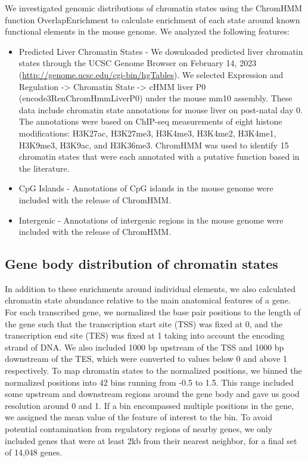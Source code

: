 \documentclass[
  11pt,
]{article}
\begin{document}
We investigated genomic distributions of chromatin states using the
ChromHMM function OverlapEnrichment to calculate enrichment of each
state around known functional elements in the mouse genome. We analyzed
the following features:

\begin{itemize}
\item
  Predicted Liver Chromatin States - We downloaded predicted liver
  chromatin states through the UCSC Genome Browser on February 14, 2023
  (\url{http://genome.ucsc.edu/cgi-bin/hgTables}). We selected
  Expression and Regulation -\textgreater{} Chromatin State
  -\textgreater{} cHMM liver P0 (encode3RenChromHmmLiverP0) under the
  mouse mm10 assembly. These data include chromatin state annotations
  for mouse liver on post-natal day 0. The annotations were based on
  ChIP-seq measurements of eight histone modifications: H3K27ac,
  H3K27me3, H3K4me3, H3K4me2, H3K4me1, H3K9me3, H3K9ac, and H3K36me3.
  ChromHMM was used to identify 15 chromatin states that were each
  annotated with a putative function based in the literature.
\item
  CpG Islands - Annotations of CpG islands in the mouse genome were
  included with the release of ChromHMM.
\item
  Intergenic - Annotations of intergenic regions in the mouse genome
  were included with the release of ChromHMM.
\end{itemize}

\hypertarget{gene-body-distribution-of-chromatin-states}{%
\subsection{Gene body distribution of chromatin
states}\label{gene-body-distribution-of-chromatin-states}}

In addition to these enrichments around individual elements, we also
calculated chromatin state abundance relative to the main anatomical
features of a gene. For each transcribed gene, we normalized the base
pair positions to the length of the gene such that the transcription
start site (TSS) was fixed at 0, and the transcription end site (TES)
was fixed at 1 taking into account the encoding strand of DNA. We also
included 1000 bp upstream of the TSS and 1000 bp downstream of the TES,
which were converted to values below 0 and above 1 respectively. To map
chromatin states to the normalized positions, we binned the normalized
positions into 42 bins running from -0.5 to 1.5. This range included
some upstream and downstream regions around the gene body and gave us
good resolution around 0 and 1. If a bin encompassed multiple positions
in the gene, we assigned the mean value of the feature of interest to
the bin. To avoid potential contamination from regulatory regions of
nearby genes, we only included genes that were at least 2kb from their
nearest neighbor, for a final set of 14,048 genes.
\end{document}
